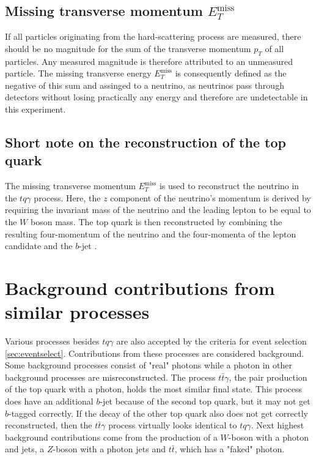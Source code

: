\subsection{Missing transverse momentum \texorpdfstring{$E_T^{\text{miss}}$}{}}

If all particles originating from the hard-scattering process are measured, there should be no magnitude for the sum of the transverse momentum $p_T$ of all particles. 
Any measured magnitude is therefore attributed to an unmeasured particle. The missing transverse energy $E_T^{\text{miss}}$ is consequently defined as the negative of this sum and assinged to a neutrino, as neutrinos pass through detectors without losing practically any energy and therefore are undetectable in this experiment.

\subsection{Short note on the reconstruction of the top quark}

The missing transverse momentum $E_T^{\text{miss}}$ is used to reconstruct the neutrino in the $tq\gamma$ process. Here, the $z$ component of the neutrino's momentum is derived by requiring the invariant mass of the neutrino and the leading lepton to be equal to the $W$ boson mass.
The top quark is then reconstructed by combining the resulting four-momentum of the neutrino and the four-momenta of the lepton candidate and the $b$-jet \cite{toprecon}.  
\section{Background contributions from similar processes}



Various processes besides $tq\gamma$ are also accepted by the criteria for event selection \ref{sec:eventselect}. Contributions from these processes are considered background. 
Some background processes consist of "real" photons while a photon in other background processes are misreconstructed. 
The process $t\bar{t}\gamma$, the pair production of the top quark with a photon, holds the most similar final state. This process does have an additional $b$-jet because of the second top quark, but it may not get $b$-tagged correctly. If the decay of the other top quark also does not get correctly reconstructed, then the $t\bar{t}\gamma$ process virtually looks identical to $tq\gamma$. 
Next highest background contributions come from the production of a $W$-boson with a photon and jets, a $Z$-boson with a photon jets and $t\bar{t}$, which has a "faked" photon.

